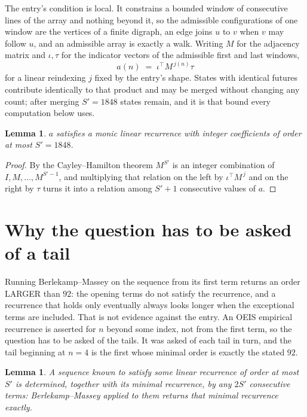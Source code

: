 \documentclass[11pt,a4paper]{article}
\theoremstyle{plain}
\newtheorem{lemma}[theorem]{Lemma}
\theoremstyle{definition}
\begin{document}
The entry's condition is local. It constrains a bounded window of consecutive lines of the
array and nothing beyond it, so the admissible configurations of one window are the vertices of
a finite digraph, an edge joins $u$ to $v$ when $v$ may follow $u$, and an admissible array is
exactly a walk. Writing $M$ for the adjacency matrix and $\iota,\tau$ for the indicator vectors
of the admissible first and last windows,
\[
a(n)\;=\;\iota^{\!\top}M^{\,j(n)}\tau
\]
for a linear reindexing $j$ fixed by the entry's shape. States with identical futures
contribute identically to that product and may be merged without changing any count; after
merging $S'=1848$ states remain, and it is that bound every computation below uses.

\begin{lemma}\label{lem:cf}
$a$ satisfies a monic linear recurrence with integer coefficients of order at most $S'=1848$.
\end{lemma}

\begin{proof}
By the Cayley--Hamilton theorem $M^{S'}$ is an integer combination of $I,M,\dots,M^{S'-1}$,
and multiplying that relation on the left by $\iota^{\!\top}M^{\,j}$ and on the right by
$\tau$ turns it into a relation among $S'+1$ consecutive values of $a$.
\end{proof}

\section{Why the question has to be asked of a tail}

Running Berlekamp--Massey on the sequence from its first term returns an order LARGER than $92$: the opening terms do not satisfy the recurrence, and a recurrence that holds only eventually always looks longer when the exceptional terms are included. That is not evidence against the entry. An OEIS empirical recurrence is asserted for $n$ beyond some index, not from the first term, so the question has to be asked of the tails. It was asked of each tail in turn, and the tail beginning at $n=4$ is the first whose minimal order is exactly the stated $92$.

\begin{lemma}\label{lem:bm}
A sequence known to satisfy some linear recurrence of order at most $S'$ is determined,
together with its minimal recurrence, by any $2S'$ consecutive terms: Berlekamp--Massey applied
to them returns that minimal recurrence exactly.
\end{lemma}
\end{document}
